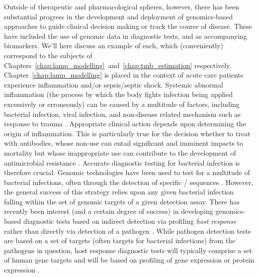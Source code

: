 \documentclass[thesis.tex]{subfiles}
\begin{document}
Outside of therapeutic and pharmacological spheres, however, there has been substantial progress in the development and deployment of genomics-based approaches to guide clinical decision making or track the course of disease. These have included the use of genomic data in diagnostic tests, and as accompanying biomarkers. We'll here discuss an example of each, which (conveniently) correspond to the subjects of Chapters~\ref{chap:lamp_modelling}~and~\ref{chap:tmb_estimation} respectively. Chapter~\ref{chap:lamp_modelling} is placed in the context of acute care patients experience inflammation and/or sepsis/septic shock. Systemic abnormal inflammation (the process by which the body fights infection being applied excessively or erroneously) can be caused by a multitude of factors, including bacterial infection, viral infection, and non-disease related mechanism such as response to trauma \citep{chen_inflammatory_2017}. Appropriate clinical action depends upon determining the origin of inflammation. This is particularly true for the decision whether to treat with antibodies, whose non-use can entail significant and imminent impacts to mortality \citep{liu_timing_2017} but whose inappropriate use can contribute to the development of antimicrobial resistance \citep{fitzpatrick_sepsis_2019}. Accurate diagnostic testing for bacterial infection is therefore crucial. Genomic technologies have been used to test for a multitude of bacterial infections, often through the detection of specific / sequences \citep{fournier_clinical_2014}. However, the general success of this strategy relies upon any given bacterial infection falling within the set of genomic targets of a given detection assay. There has recently been interest (and a certain degree of success) in developing genomics-based diagnostic tests based on indirect detection via profiling \emph{host response} rather than directly via detection of a pathogen \citep{safarika_29-mrna_2021, kelly_systematic_2022}. While pathogen detection tests are based on a set of targets (often  targets for bacterial infections) from the pathogens in question, host response diagnostic tests will typically comprise a set of human gene targets and will be based on profiling of gene expression \citep{ram-mohan_using_2022} or protein expression \citep{vanderboom_proteomic_2021}.
\end{document}
